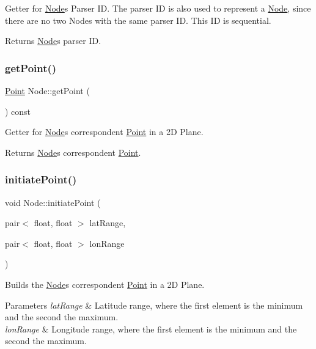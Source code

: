 Getter for \hyperlink{class_node}{Node}\textquotesingle{}s Parser ID. The parser ID is also used to represent a \hyperlink{class_node}{Node}, since there are no two Nodes with the same parser ID. This ID is sequential.

\begin{DoxyReturn}{Returns}
\hyperlink{class_node}{Node}\textquotesingle{}s parser ID. 
\end{DoxyReturn}
\hypertarget{class_node_a73562032360227efd9fe93d07ab2475f}{}\label{class_node_a73562032360227efd9fe93d07ab2475f} 
\subsubsection{\texorpdfstring{get\+Point()}{getPoint()}}
{\footnotesize\ttfamily \hyperlink{class_point}{Point} Node\+::get\+Point (\begin{DoxyParamCaption}{ }\end{DoxyParamCaption}) const}

Getter for \hyperlink{class_node}{Node}\textquotesingle{}s correspondent \hyperlink{class_point}{Point} in a 2D Plane.

\begin{DoxyReturn}{Returns}
\hyperlink{class_node}{Node}\textquotesingle{}s correspondent \hyperlink{class_point}{Point}. 
\end{DoxyReturn}
\hypertarget{class_node_a599f948564fa9f0cb358fe030161eb1e}{}\label{class_node_a599f948564fa9f0cb358fe030161eb1e} 
\subsubsection{\texorpdfstring{initiate\+Point()}{initiatePoint()}}
{\footnotesize\ttfamily void Node\+::initiate\+Point (\begin{DoxyParamCaption}\item[{pair$<$ float, float $>$}]{lat\+Range,  }\item[{pair$<$ float, float $>$}]{lon\+Range }\end{DoxyParamCaption})}

Builds the \hyperlink{class_node}{Node}\textquotesingle{}s correspondent \hyperlink{class_point}{Point} in a 2D Plane.


\begin{DoxyParams}{Parameters}
{\em lat\+Range} & Latitude range, where the first element is the minimum and the second the maximum. \\
\hline
{\em lon\+Range} & Longitude range, where the first element is the minimum and the second the maximum. \\
\hline
\end{DoxyParams}
\hypertarget{class_node_a97dd8f95e09a0516f8939627f94bd58e}{}\label{class_node_a97dd8f95e09a0516f8939627f94bd58e} 
